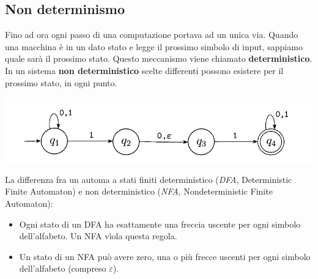 \documentclass[italian]{article}
\begin{document}
\subsection{Non determinismo}
Fino ad ora ogni passo di una computazione portava ad un unica via. Quando una macchina è in un dato stato e legge il prossimo simbolo di input, sappiamo quale sarà il prossimo stato. Questo meccanismo viene chiamato \textbf{deterministico}. In un sistema \textbf{non deterministico} scelte differenti possono esistere per il prossimo stato, in ogni punto.
\begin{center}
	\includegraphics[width=0.5\linewidth]{images/ndautoma1}
\end{center}
La differenza fra un automa a stati finiti deterministico (\textit{DFA}, Deterministic Finite Automaton) e non deterministico  (\textit{NFA}, Nondeterministic Finite Automaton):
\begin{itemize}
	\item Ogni stato di un DFA ha esattamente una freccia uscente per ogni simbolo dell'alfabeto. Un NFA vìola questa regola.
	\item Un stato di un NFA può avere zero, una o più frecce uscenti per ogni simbolo dell'alfabeto (compreso $\varepsilon$).
\end{itemize}
\end{document}
